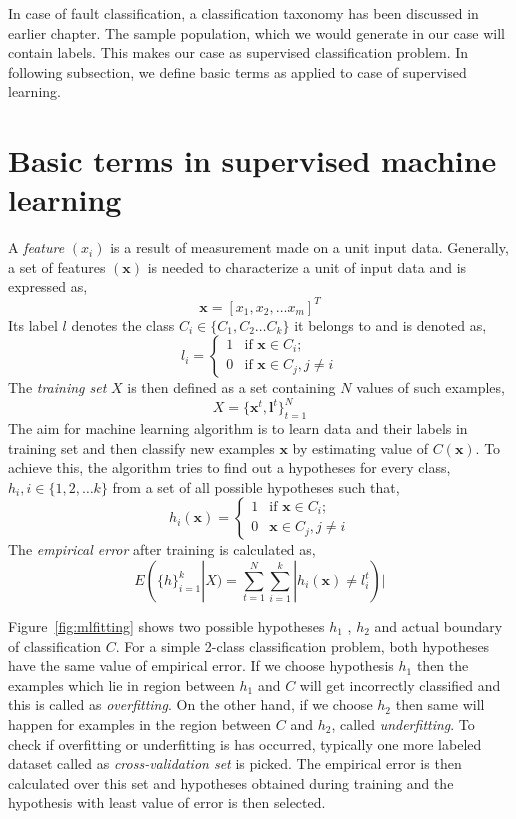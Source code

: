 In case of fault classification, a classification taxonomy has been discussed in earlier chapter. The sample population, which we would generate in our case will contain labels. This makes our case as supervised classification problem. In following subsection, we define basic terms as applied to case of supervised learning.

\section{Basic terms in supervised machine learning}

A \emph{feature} $(x_i)$ is a result of measurement made on a unit input data. Generally, a set of features $(\boldsymbol{x})$ is needed to characterize a unit of input data and is expressed as,
\[ \boldsymbol{x} = \left[ x_1, x_2, \ldots x_m \right]^T \]  
Its label $l$ denotes the class $C_i \in \{C_1, C_2 \ldots C_k\}$ it belongs to and is denoted as,
\[ l_i = \left\{ \begin{array}{ll}
         1 & \mbox{if $\boldsymbol{x} \in C_i$};\\
         0 & \mbox{if $\boldsymbol{x} \in C_j, j \neq i$}\end{array} \right. \] 
The \emph{training set} $X$ is then defined as a set containing $N$ values of such examples,
\[ X = \{\boldsymbol{x}^t , \boldsymbol{l}^t \}_{t=1}^N  \]
The aim for machine learning algorithm is to learn data and their labels in training set and then classify new examples $\boldsymbol{x}$ by estimating value of $C(\boldsymbol{x})$. To achieve this, the algorithm tries to find out a hypotheses for every class, $h_i, i \in\{1,2, \ldots k\}$ from a set of all possible hypotheses such that,
\[ h_i(\boldsymbol{x}) = \left\{ \begin{array}{ll}
         1 & \mbox{if $\boldsymbol{x} \in C_i$};\\
         0 & \mbox{$\boldsymbol{x} \in C_j, j \neq i$}\end{array} \right. \] 
The \emph{empirical error} after training is calculated as,
\[ E(\{h\}_{i=1}^k|X) = \sum\limits_{t=1}^N \sum\limits_{i=1}^k | h_i(\boldsymbol{x}) \neq l_i^t ) | \]

Figure~\ref{fig:mlfitting} shows two possible hypotheses $h_1$ , $h_2$ and actual boundary of classification $C$. For a simple 2-class classification problem, both hypotheses have the same value of empirical error. If we choose hypothesis $h_1$ then the examples which lie in region between $h_1$ and $C$ will get incorrectly classified and this is called as \emph{overfitting}. On the other hand, if we choose $h_2$ then same will happen for examples in the region between $C$ and $h_2$, called \emph{underfitting}. To check if overfitting or underfitting is has occurred, typically one more labeled dataset called as \emph{cross-validation set} is picked. The empirical error is then calculated over this set and hypotheses obtained during training and the hypothesis with least value of error is then selected. 

